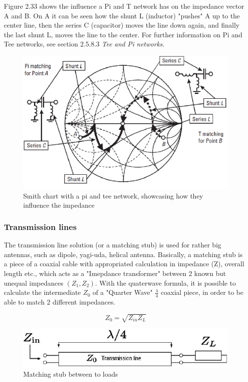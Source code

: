 Figure 2.33 shows the influence a Pi and T network has on the impedance vector A and B. On A it can be seen how the shunt L (inductor) "pushes" A up to the center line, then the series C (capacitor) moves the line down again, and finally the last shunt L, moves the line to the center. For further information on Pi and Tee networks, see section 2.5.8.3 \textit{Tee and Pi networks}.  

\begin{figure}[h]
\centering
\includegraphics[scale=0.7]{figures/PiTeeSmithChart.PNG}
\caption{Smith chart\cite{SmithChart} with a pi and tee network, showcasing how they influence the impedance}
\end{figure}


\subsubsection{Transmission lines}
The transmission line solution (or a matching stub) is used for rather big antennas, such as dipole, yagi-uda, helical antenna. Basically, a matching stub is a piece of a coaxial cable with appropriated calculation in impedance (Z), overall length etc., which acts as a "Imepdance transformer" between 2 known but unequal impedances $(Z_1,Z_2)$. With the quaterwave formula, it is possible to calculate the intermediate $Z_0$ of a "Quarter Wave" $\frac{\lambda}{4}$ coaxial piece, in order to be able to match 2 different impedances. 

\begin{equation}
   Z_0 = \sqrt{Z_{in}Z_{L}}
\end{equation}

\begin{figure}[h]
\centering
\includegraphics[scale=0.7]{figures/TransmissionLine.PNG}
\caption{Matching stub between to loads}
\end{figure}

